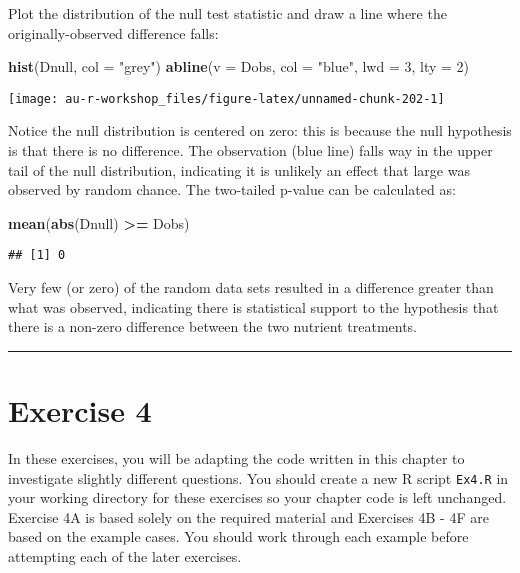 \documentclass[]{book}
\newenvironment{Shaded}{\begin{snugshade}}{\end{snugshade}}
\newcommand{\KeywordTok}[1]{\textcolor[rgb]{0.13,0.29,0.53}{\textbf{#1}}}
\newcommand{\DataTypeTok}[1]{\textcolor[rgb]{0.13,0.29,0.53}{#1}}
\newcommand{\DecValTok}[1]{\textcolor[rgb]{0.00,0.00,0.81}{#1}}
\newcommand{\StringTok}[1]{\textcolor[rgb]{0.31,0.60,0.02}{#1}}
\newcommand{\OperatorTok}[1]{\textcolor[rgb]{0.81,0.36,0.00}{\textbf{#1}}}
\newcommand{\NormalTok}[1]{#1}
\theoremstyle{definition}
\theoremstyle{definition}
\theoremstyle{definition}
\theoremstyle{remark}
\begin{document}
Plot the distribution of the null test statistic and draw a line where
the originally-observed difference falls:

\begin{Shaded}
\begin{Highlighting}[]
\KeywordTok{hist}\NormalTok{(Dnull, }\DataTypeTok{col =} \StringTok{"grey"}\NormalTok{)}
\KeywordTok{abline}\NormalTok{(}\DataTypeTok{v =}\NormalTok{ Dobs, }\DataTypeTok{col =} \StringTok{"blue"}\NormalTok{, }\DataTypeTok{lwd =} \DecValTok{3}\NormalTok{, }\DataTypeTok{lty =} \DecValTok{2}\NormalTok{)}
\end{Highlighting}
\end{Shaded}

\begin{center}\texttt{[image: au-r-workshop\_files/figure-latex/unnamed-chunk-202-1]} \end{center}

Notice the null distribution is centered on zero: this is because the
null hypothesis is that there is no difference. The observation (blue
line) falls way in the upper tail of the null distribution, indicating
it is unlikely an effect that large was observed by random chance. The
two-tailed p-value can be calculated as:

\begin{Shaded}
\begin{Highlighting}[]
\KeywordTok{mean}\NormalTok{(}\KeywordTok{abs}\NormalTok{(Dnull) }\OperatorTok{>=}\StringTok{ }\NormalTok{Dobs)}
\end{Highlighting}
\end{Shaded}

\begin{verbatim}
## [1] 0
\end{verbatim}

Very few (or zero) of the random data sets resulted in a difference
greater than what was observed, indicating there is statistical support
to the hypothesis that there is a non-zero difference between the two
nutrient treatments.

\begin{center}\rule{0.5\linewidth}{\linethickness}\end{center}

\section{Exercise 4}\label{exercise-4}

In these exercises, you will be adapting the code written in this
chapter to investigate slightly different questions. You should create a
new R script \texttt{Ex4.R} in your working directory for these
exercises so your chapter code is left unchanged. Exercise 4A is based
solely on the required material and Exercises 4B - 4F are based on the
example cases. You should work through each example before attempting
each of the later exercises.
\end{document}
